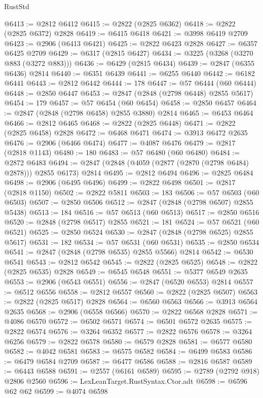 \begin{lexlean}{RustStd}
\begin{coremodule}
@6413 := @2812 @6412
@6415 := @2822 (@2825 @6362)
@6418 := @2822 (@2825 @6372) @2828
@6419 := @6415 @6418
@6421 := @3998 @6419 @2709
@6423 := @2906 (@6413 @6421)
@6425 := @2822 @6423 @2828
@6427 := @6357 @6425 @2709
@6429 := @6317 (@2815 @6427)
@6434 := @3225 (@3268 (@3270 @883 (@3272 @883)))
@6436 := @6429 (@2815 @6434)
@6439 := @2847 (@6355 @6436) @2814
@6440 := @6351 @6439
@6441 := @6255 @6440
@6442 := @6182 @6441
@6443 := @2812 @6442
@6444 := 178
@6447 := @57 @6444 (@60 @6444)
@6448 := @2850 @6447
@6453 := @2847 (@2848 (@2798 @6448) @2855 @5617)
@6454 := 179
@6457 := @57 @6454 (@60 @6454)
@6458 := @2850 @6457
@6464 := @2847 (@2848 (@2798 @6458) @2855 @3880) @2814
@6465 := @6453 @6464
@6466 := @2812 @6465
@6468 := @2822 (@2825 @6448)
@6471 := @2822 (@2825 @6458) @2828
@6472 := @6468 @6471
@6474 := @3913 @6472 @2635
@6476 := @2906 (@6466 @6474)
@6477 := @4087 @6476
@6479 := @2817 (@2818 @1143)
@6480 := 180
@6483 := @57 @6480 (@60 @6480)
@6484 := @2872 @6483
@6494 := @2847 (@2848 (@4059 (@2877 (@2870 (@2798 @6484) @2878))) @2855 @6173) @2814
@6495 := @2812 @6494
@6496 := @2825 @6484
@6498 := @2906 (@6495 @6496)
@6499 := @2822 @6498
@6501 := @2817 (@2818 @1150)
@6502 := @2822 @5811
@6503 := 183
@6506 := @57 @6503 (@60 @6503)
@6507 := @2850 @6506
@6512 := @2847 (@2848 (@2798 @6507) @2855 @5438)
@6513 := 184
@6516 := @57 @6513 (@60 @6513)
@6517 := @2850 @6516
@6520 := @2848 (@2798 @6517) @2855
@6521 := 181
@6524 := @57 @6521 (@60 @6521)
@6525 := @2850 @6524
@6530 := @2847 (@2848 (@2798 @6525) @2855 @5617)
@6531 := 182
@6534 := @57 @6531 (@60 @6531)
@6535 := @2850 @6534
@6541 := @2847 (@2848 (@2798 @6535) @2855 @5566) @2814
@6542 := @6530 @6541
@6543 := @2812 @6542
@6545 := @2822 (@2825 @6525)
@6548 := @2822 (@2825 @6535) @2828
@6549 := @6545 @6548
@6551 := @5377 @6549 @2635
@6553 := @2906 (@6543 @6551)
@6556 := @2847 (@6520 @6553) @2814
@6557 := @6512 @6556
@6558 := @2812 @6557
@6560 := @2822 (@2825 @6507)
@6563 := @2822 (@2825 @6517) @2828
@6564 := @6560 @6563
@6566 := @3913 @6564 @2635
@6568 := @2906 (@6558 @6566)
@6570 := @2822 @6568 @2828
@6571 := @4086 @6570
@6572 := @6502 @6571
@6574 := @6501 @6572 @2635
@6575 := @2822 @6574
@6576 := @3264 @6352
@6577 := @2822 @6576
@6578 := @3264 @6256
@6579 := @2822 @6578
@6580 := @6579 @2828
@6581 := @6577 @6580
@6582 := @4042 @6581
@6583 := @6575 @6582
@6584 := @6499 @6583
@6586 := @6479 @6584 @2709
@6587 := @6477 @6586
@6588 := @2816 @6587
@6589 := @6443 @6588
@6591 := @2557 (@6161 @6589)
@6595 := @2789 (@2792 @918) @2806 @2560
@6596 := LexLeanTarget.RustSyntax.Ctor.adt
@6598 := @6596 @62 @62
@6599 := @4074 @6598

\end{coremodule}
\end{lexlean}
